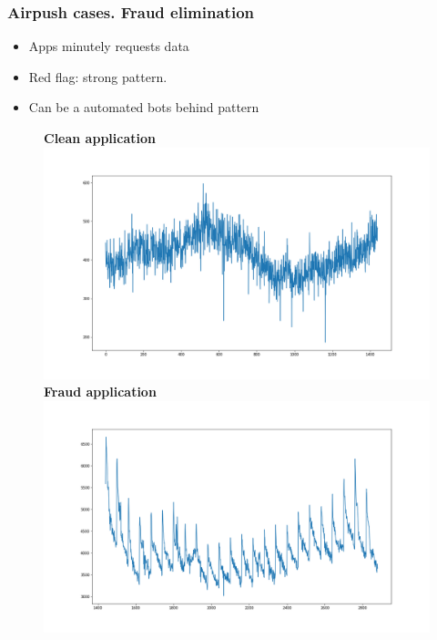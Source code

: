 \documentclass[intlimits, 9pt, unicode]{beamer}
\begin{document}
\begin{frame}
    \frametitle{Airpush cases. Fraud elimination}
    \begin{itemize}
    	\item Apps minutely requests data
	\item Red flag: strong pattern.
	\item Can be a automated bots behind pattern
    \end{itemize}
    \begin{figure}
	\textbf{Clean application}
	\includegraphics[scale=0.10]{images/007_case_1}
	\textbf{Fraud application}
	\includegraphics[scale=0.10]{images/008_case_1}
     \end{figure}
	
\end{frame}
\end{document}
